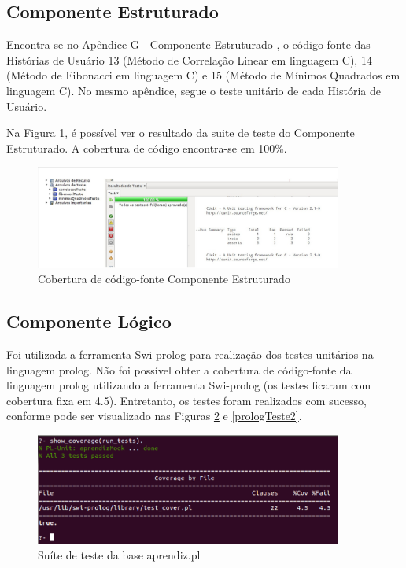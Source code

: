 \subsection{Componente Estruturado}
Encontra-se no Apêndice G - Componente Estruturado , o código-fonte das Histórias de Usuário 13 (Método de Correlação Linear em linguagem C), 14 (Método de Fibonacci em linguagem C) e 15 (Método de Mínimos Quadrados em linguagem C). No mesmo apêndice, segue o teste
unitário de cada História de Usuário.

Na Figura \ref{testeC}, é possível ver o resultado da suite de teste do Componente Estruturado. A cobertura de código encontra-se em 100\%.

\begin{figure}[H]
\centering
\includegraphics[width=0.9\textwidth]{figuras/testeC}
\caption{Cobertura de código-fonte Componente Estruturado}
\label{testeC}
\end{figure}

\subsection{Componente Lógico}
Foi utilizada a ferramenta Swi-prolog para realização dos testes unitários na linguagem prolog. Não foi possível obter a cobertura de código-fonte da linguagem prolog utilizando a ferramenta Swi-prolog (os testes ficaram com cobertura fixa em 4.5). Entretanto, os testes foram realizados com sucesso, conforme pode ser visualizado nas Figuras \ref{prologTeste1} e \ref{prologTeste2}. 

\begin{figure}[H]
\centering
\includegraphics[width=0.9\textwidth]{figuras/prologTeste1}
\caption{Suíte de teste da base aprendiz.pl}
\label{prologTeste1}
\end{figure}

